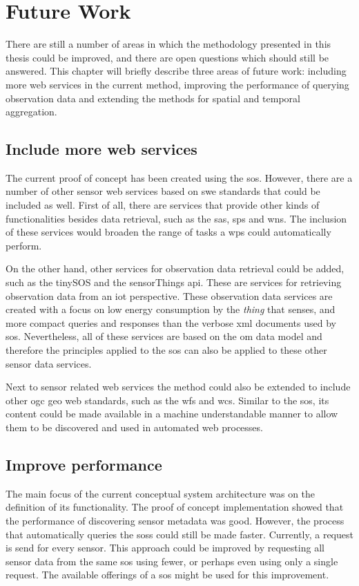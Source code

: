 
\chapter{Future Work}
\label{chap:futureResearch}

There are still a number of areas in which the methodology presented in this thesis could be improved, and there are open questions which should still be answered. This chapter will briefly describe three areas of future work: including more web services in the current method, improving the performance of querying observation data and extending the methods for spatial and temporal aggregation. 

\section{Include more web services}
The current proof of concept has been created using the \ac{sos}. However, there are a number of other sensor web services based on \ac{swe} standards that could be included as well. First of all, there are services that provide other kinds of functionalities besides data retrieval, such as the \acf{sas}, \acf{sps} and \acf{wns}. The inclusion of these services would broaden the range of tasks a \ac{wps} could automatically perform. 

On the other hand, other services for observation data retrieval could be added, such as the tinySOS and the sensorThings \ac{api}. These are services for retrieving observation data from an \ac{iot} perspective. These observation data services are created with a focus on low energy consumption by the \textit{thing} that senses, and more compact queries and responses than the verbose \ac{xml} documents used by \ac{sos}. Nevertheless, all of these services are based on the \ac{om} data model and therefore the principles applied to the \ac{sos} can also be applied to these other sensor data services.  

Next to sensor related web services the method could also be extended to include other \ac{ogc} geo web standards, such as the \acf{wfs} and \acf{wcs}. Similar to the \ac{sos}, its content could be made available in a machine understandable manner to allow them to be discovered and used in automated web processes.    

\section{Improve performance}
The main focus of the current conceptual system architecture was on the definition of its functionality. The proof of concept implementation showed that the performance of discovering sensor metadata was good. However, the process that automatically queries the \aclp{sos} could still be made faster. Currently, a request is send for every sensor. This approach could be improved by requesting all sensor data from the same \ac{sos} using fewer, or perhaps even using only a single request. The available offerings of a \ac{sos} might be used for this improvement.      

